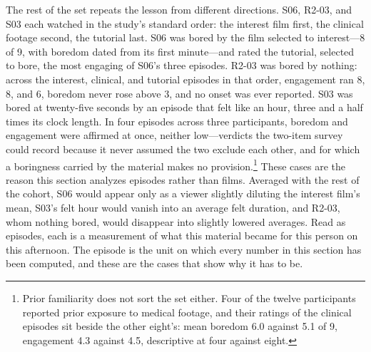 The rest of the set repeats the lesson from different directions. S06, R2-03, and S03 each
watched in the study's standard order: the interest film first, the clinical footage second,
the tutorial last. S06 was bored by the film selected to interest---8 of 9, with boredom
dated from its first minute---and rated the tutorial, selected to bore, the most engaging of
S06's three episodes. R2-03 was bored by nothing: across the interest, clinical, and tutorial
episodes in that order, engagement ran 8, 8, and 6, boredom never rose above 3, and no onset
was ever reported. S03 was bored at twenty-five seconds by an episode that felt like an hour,
three and a half times its clock length. In four episodes across three participants, boredom
and engagement were affirmed at once, neither low---verdicts the two-item survey could record
because it never assumed the two exclude each other, and for which a boringness carried by
the material makes no provision.\footnote{Prior familiarity does not sort the set either.
Four of the twelve participants reported prior exposure to medical footage, and their ratings
of the clinical episodes sit beside the other eight's: mean boredom 6.0 against 5.1 of 9,
engagement 4.3 against 4.5, descriptive at four against eight.} These cases are the reason
this section analyzes episodes rather than films. Averaged with the rest of the cohort, S06
would appear only as a viewer slightly diluting the interest film's mean, S03's felt hour
would vanish into an average felt duration, and R2-03, whom nothing bored, would disappear
into slightly lowered averages. Read as episodes, each is a measurement of what this material
became for this person on this afternoon. The episode is the unit on which every number in
this section has been computed, and these are the cases that show why it has to be.

